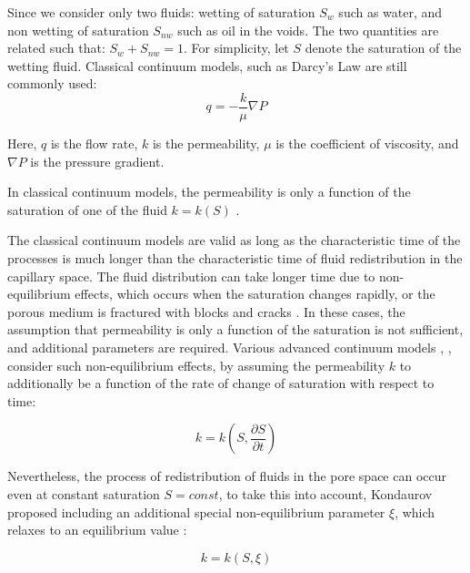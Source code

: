 \documentclass[
	12pt
] {article}
\begin{document}
	Since we consider only two fluids: wetting of saturation $S_w$ such as water, and non wetting of saturation $S_{nw}$ such as oil in the voids. The two quantities are related such that: $S_{w} + S_{nw} = 1$. For simplicity, let $S$ denote the saturation of the wetting fluid. Classical continuum models, such as Darcy's Law \cite{darcy1856fontaines} are still commonly used:
	\begin{equation}
		q = -\frac{k}{\mu} \nabla P
	\end{equation}
	
	Here, $q$ is the flow rate, $k$ is the permeability, $\mu$ is the coefficient of viscosity, and $\nabla P$ is the pressure gradient.
	
	In classical continuum models, the permeability is only a function of the saturation of one of the fluid $k = k(S)$ \cite{kondaurov2007thermodynamically} \cite{kondaurov2009non}.
	
	The classical continuum models are valid as long as the characteristic time of the processes is much longer than the characteristic time of fluid redistribution in the capillary space. The fluid distribution can take longer time due to non-equilibrium effects, which occurs when the saturation changes rapidly, or the porous medium is fractured with blocks and cracks \cite{barenblatt1960basic} \cite{barenblatt2003mathematical}. In these cases, the assumption that permeability is only a function of the saturation is not sufficient, and additional parameters are required. Various advanced continuum models \cite{hassanizadeh2004continuum}, \cite{hassanizadeh1987high}, \cite{barenblatt1960basic} consider such non-equilibrium effects, by assuming the permeability $k$ to additionally be a function of the rate of change of saturation with respect to time:
	
	\begin{equation} \label{eq:conn-adv-model-perm}
		k = k(S, \frac{\partial S}{\partial t})
	\end{equation}

	Nevertheless, the process of redistribution of fluids in the pore space can occur even at constant saturation $S = const$, to take this into account, Kondaurov proposed including an additional special non-equilibrium parameter  $\xi$, which relaxes to an equilibrium value \cite{kondaurov2007thermodynamically} \cite{kondaurov2009non}:
	
	\begin{equation}
		k = k(S, \xi)
	\end{equation}
	
\end{document}
